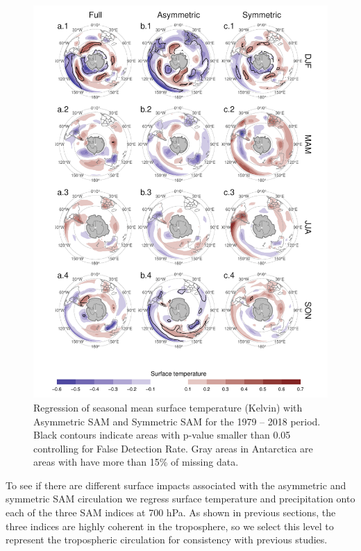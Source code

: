 \documentclass[]{ametsocV5}
\begin{document}
\begin{figure}
\includegraphics{regr-air-season-1} \caption[Regression of seasonal mean surface temperature (Kelvin) with Asymmetric SAM and Symmetric SAM for the 1979 -- 2018 period]{Regression of seasonal mean surface temperature (Kelvin) with Asymmetric SAM and Symmetric SAM for the 1979 -- 2018 period. Black contours indicate areas with p-value smaller than 0.05 controlling for False Detection Rate. Gray areas in Antarctica are areas with have more than 15\% of missing data.}\label{fig:regr-air-season}
\end{figure}

To see if there are different surface impacts associated with the asymmetric and symmetric SAM circulation we regress surface temperature and precipitation onto each of the three SAM indices at 700 hPa. As shown in previous sections, the three indices are highly coherent in the troposphere, so we select this level to represent the tropospheric circulation for consistency with previous studies.
\end{document}
